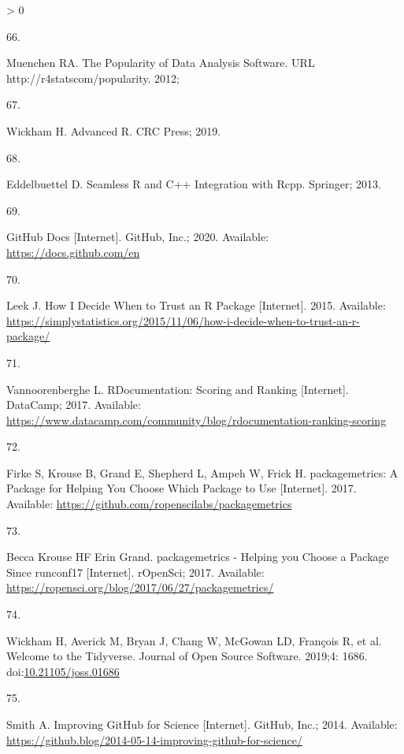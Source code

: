\documentclass[10pt,letterpaper]{article}
\newlength{\csllabelwidth}
\newlength{\cslhangindent}
\newenvironment{CSLReferences}[3] %
 {%
  \setlength{\parindent}{0pt}
  \ifodd #1 \everypar{\setlength{\hangindent}{\cslhangindent}}\ignorespaces\fi
  \ifnum #2 > 0
  \setlength{\parskip}{#2\baselineskip}
  \fi
 }%
 {}
\newcommand{\CSLLeftMargin}[1]{\parbox[t]{\csllabelwidth}{#1}}
\newcommand{\CSLRightInline}[1]{\parbox[t]{\linewidth - \csllabelwidth}{#1}}
\begin{document}
\begin{CSLReferences}{0}{0}
\leavevmode\hypertarget{ref-muenchen2012}{}%
\CSLLeftMargin{66. }
\CSLRightInline{Muenchen RA. {The Popularity of Data Analysis Software}.
URL http://r4statscom/popularity. 2012; }

\leavevmode\hypertarget{ref-wickham2019}{}%
\CSLLeftMargin{67. }
\CSLRightInline{Wickham H. {Advanced R}. CRC Press; 2019. }

\leavevmode\hypertarget{ref-eddelbuettel2013}{}%
\CSLLeftMargin{68. }
\CSLRightInline{Eddelbuettel D. {Seamless R and C++ Integration with
Rcpp}. Springer; 2013. }

\leavevmode\hypertarget{ref-githubdocs}{}%
\CSLLeftMargin{69. }
\CSLRightInline{{GitHub Docs} {[}Internet{]}. GitHub, Inc.; 2020.
Available: \url{https://docs.github.com/en}}

\leavevmode\hypertarget{ref-leek2015}{}%
\CSLLeftMargin{70. }
\CSLRightInline{Leek J. {How I Decide When to Trust an R Package}
{[}Internet{]}. 2015. Available:
\url{https://simplystatistics.org/2015/11/06/how-i-decide-when-to-trust-an-r-package/}}

\leavevmode\hypertarget{ref-vannoorenberghe2017}{}%
\CSLLeftMargin{71. }
\CSLRightInline{Vannoorenberghe L. {RDocumentation: Scoring and Ranking}
{[}Internet{]}. DataCamp; 2017. Available:
\url{https://www.datacamp.com/community/blog/rdocumentation-ranking-scoring}}

\leavevmode\hypertarget{ref-packagemetrics}{}%
\CSLLeftMargin{72. }
\CSLRightInline{Firke S, Krouse B, Grand E, Shepherd L, Ampeh W, Frick
H. {packagemetrics: A Package for Helping You Choose Which Package to
Use} {[}Internet{]}. 2017. Available:
\url{https://github.com/ropenscilabs/packagemetrics}}

\leavevmode\hypertarget{ref-packagemetricsblog}{}%
\CSLLeftMargin{73. }
\CSLRightInline{Becca Krouse HF Erin Grand. {packagemetrics - Helping
you Choose a Package Since runconf17} {[}Internet{]}. rOpenSci; 2017.
Available: \url{https://ropensci.org/blog/2017/06/27/packagemetrics/}}

\leavevmode\hypertarget{ref-tidyverse}{}%
\CSLLeftMargin{74. }
\CSLRightInline{Wickham H, Averick M, Bryan J, Chang W, McGowan LD,
François R, et al. {Welcome to the Tidyverse}. Journal of Open Source
Software. 2019;4: 1686.
doi:\href{https://doi.org/10.21105/joss.01686}{10.21105/joss.01686}}

\leavevmode\hypertarget{ref-smith2014}{}%
\CSLLeftMargin{75. }
\CSLRightInline{Smith A. {Improving GitHub for Science} {[}Internet{]}.
GitHub, Inc.; 2014. Available:
\url{https://github.blog/2014-05-14-improving-github-for-science/}}


\end{CSLReferences}
\end{document}
